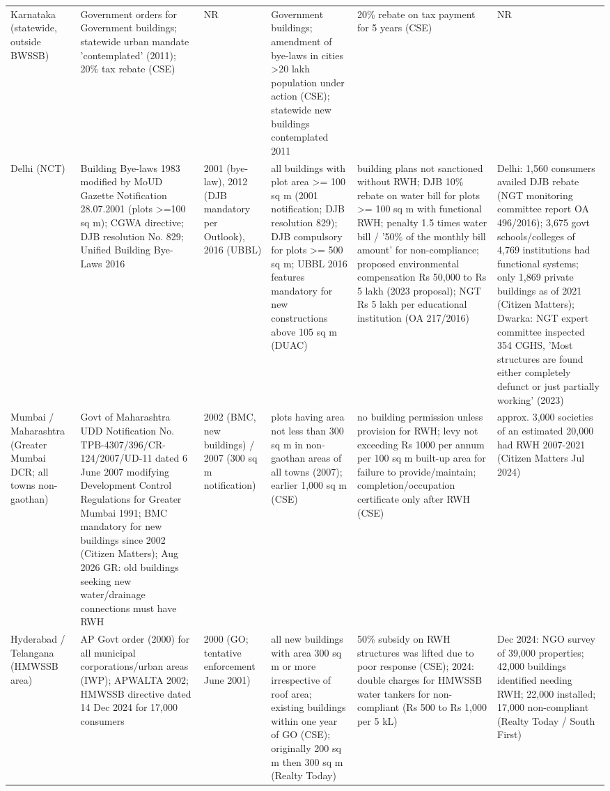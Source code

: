 {\begin{longtable}{p{2.1cm} p{3cm} p{1.3cm} p{3cm} p{2.9cm} p{3.4cm}}
Karnataka (statewide, outside BWSSB) & Government orders for Government buildings; statewide urban mandate 'contemplated' (2011); 20\% tax rebate (CSE) & NR & Government buildings; amendment of bye-laws in cities >20 lakh population under action (CSE); statewide new buildings contemplated 2011 & 20\% rebate on tax payment for 5 years (CSE) & NR\\
Delhi (NCT) & Building Bye-laws 1983 modified by MoUD Gazette Notification 28.07.2001 (plots >=100 sq m); CGWA directive; DJB resolution No. 829; Unified Building Bye-Laws 2016 & 2001 (bye-law), 2012 (DJB mandatory per Outlook), 2016 (UBBL) & all buildings with plot area >= 100 sq m (2001 notification; DJB resolution 829); DJB compulsory for plots >= 500 sq m; UBBL 2016 features mandatory for new constructions above 105 sq m (DUAC) & building plans not sanctioned without RWH; DJB 10\% rebate on water bill for plots >= 100 sq m with functional RWH; penalty 1.5 times water bill / '50\% of the monthly bill amount' for non-compliance; proposed environmental compensation Rs 50,000 to Rs 5 lakh (2023 proposal); NGT Rs 5 lakh per educational institution (OA 217/2016) & Delhi: 1,560 consumers availed DJB rebate (NGT monitoring committee report OA 496/2016); 3,675 govt schools/colleges of 4,769 institutions had functional systems; only 1,869 private buildings as of 2021 (Citizen Matters); Dwarka: NGT expert committee inspected 354 CGHS, 'Most structures are found either completely defunct or just partially working' (2023)\\
Mumbai / Maharashtra (Greater Mumbai DCR; all towns non-gaothan) & Govt of Maharashtra UDD Notification No. TPB-4307/396/CR-124/2007/UD-11 dated 6 June 2007 modifying Development Control Regulations for Greater Mumbai 1991; BMC mandatory for new buildings since 2002 (Citizen Matters); Aug 2026 GR: old buildings seeking new water/drainage connections must have RWH & 2002 (BMC, new buildings) / 2007 (300 sq m notification) & plots having area not less than 300 sq m in non-gaothan areas of all towns (2007); earlier 1,000 sq m (CSE) & no building permission unless provision for RWH; levy not exceeding Rs 1000 per annum per 100 sq m built-up area for failure to provide/maintain; completion/occupation certificate only after RWH (CSE) & approx. 3,000 societies of an estimated 20,000 had RWH 2007-2021 (Citizen Matters Jul 2024)\\
Hyderabad / Telangana (HMWSSB area) & AP Govt order (2000) for all municipal corporations/urban areas (IWP); APWALTA 2002; HMWSSB directive dated 14 Dec 2024 for 17,000 consumers & 2000 (GO; tentative enforcement June 2001) & all new buildings with area 300 sq m or more irrespective of roof area; existing buildings within one year of GO (CSE); originally 200 sq m then 300 sq m (Realty Today) & 50\% subsidy on RWH structures was lifted due to poor response (CSE); 2024: double charges for HMWSSB water tankers for non-compliant (Rs 500 to Rs 1,000 per 5 kL) & Dec 2024: NGO survey of 39,000 properties; 42,000 buildings identified needing RWH; 22,000 installed; 17,000 non-compliant (Realty Today / South First)\\

\end{longtable}}
